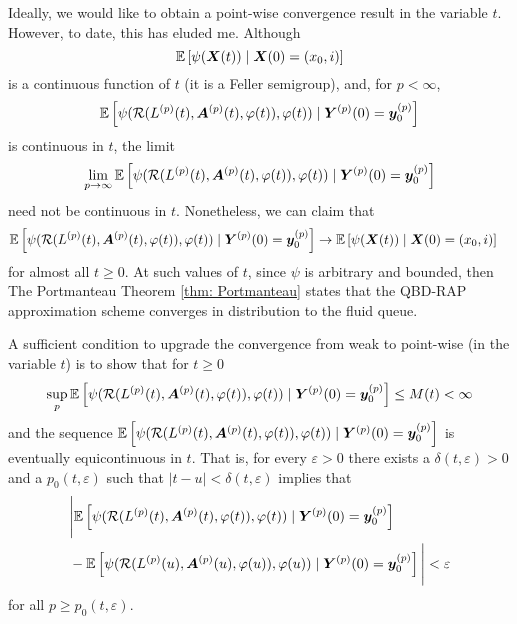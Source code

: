 Ideally, we would like to obtain a point-wise convergence result in the variable \(t\). However, to date, this has eluded me. Although 
\[\mathbb E\left[\psi({\boldsymbol X}(t))\mid \boldsymbol X(0)=(x_0,i) \right]\] 
is a continuous function of \(t\) (it is a Feller semigroup), and, for \(p<\infty\), 
\[\mathbb E\left[\psi( \mathcal R(L^{(p)}(t),\boldsymbol A^{(p)}(t),\varphi(t)),\varphi(t) )   \mid \boldsymbol Y^{(p)}(0)=\boldsymbol y_0^{(p)} \right]  \]
 is continuous in \(t\), the limit 
 \[\lim\limits_{p\to\infty}\mathbb E\left[\psi( \mathcal R(L^{(p)}(t),\boldsymbol A^{(p)}(t),\varphi(t)),\varphi(t) ) \mid \boldsymbol Y^{(p)}(0)=\boldsymbol y_0^{(p)}\right]  \] need not be continuous in \(t\). Nonetheless, we can claim that 
\begin{align}
		&\mathbb E\left[\psi( \mathcal R(L^{(p)}(t),\boldsymbol A^{(p)}(t),\varphi(t)),\varphi(t) )    \mid \boldsymbol Y^{(p)}(0)=\boldsymbol y_0^{(p)}\right]  \nonumber
		\to \mathbb E\left[\psi({\boldsymbol X}(t) )\mid \boldsymbol X(0)=(x_0, i) \right] \nonumber
\end{align}
for almost all \(t\geq 0\). At such values of \(t\), since \(\psi\) is arbitrary and bounded, then The Portmanteau Theorem \ref{thm: Portmanteau} states that the QBD-RAP approximation scheme converges in distribution to the fluid queue. 

A sufficient condition to upgrade the convergence from weak to point-wise (in the variable \(t\)) is to show that for \(t\geq 0\) 
\[\sup_{p}\mathbb E\left[\psi( \mathcal R(L^{(p)}(t),\boldsymbol A^{(p)}(t),\varphi(t)),\varphi(t) )  \mid \boldsymbol Y^{(p)}(0)=\boldsymbol y_0^{(p)} \right]  \leq M(t)<\infty\]
and the sequence \(\mathbb E\left[\psi( \mathcal R(L^{(p)}(t),\boldsymbol A^{(p)}(t),\varphi(t)),\varphi(t) )   \mid \boldsymbol Y^{(p)}(0)=\boldsymbol y_0^{(p)} \right]  \) is eventually equicontinuous in \(t\). That is, for every \(\varepsilon>0\) there exists a \(\delta(t,\varepsilon)>0\) and a \(p_0(t,\varepsilon)\) such that \(|t-u|<\delta(t,\varepsilon)\) implies that 
\begin{align}
	&\nonumber \Bigg|\mathbb E\left[\psi( \mathcal R(L^{(p)}(t),\boldsymbol A^{(p)}(t),\varphi(t)),\varphi(t) )   \mid \boldsymbol Y^{(p)}(0)=\boldsymbol y_0^{(p)} \right] 
	\\&{}-\mathbb E\left[\psi( \mathcal R(L^{(p)}(u),\boldsymbol A^{(p)}(u),\varphi(u)),\varphi(u) )   \mid \boldsymbol Y^{(p)}(0)=\boldsymbol y_0^{(p)}\right] \Bigg| \nonumber 
	<\varepsilon
\end{align}
for all \(p\geq p_0(t,\varepsilon)\). 

